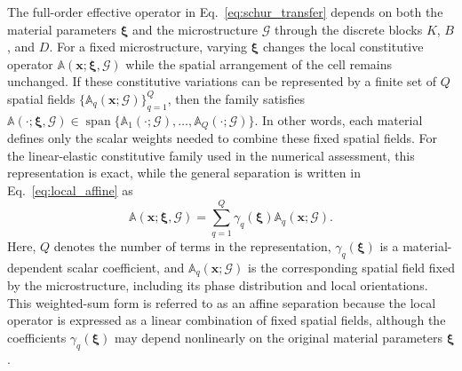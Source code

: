\documentclass[pdflatex,sn-basic,Numbered]{sn-jnl}
\newcommand{\G}{\mathcal{G}}
\begin{document}
The full-order effective operator in Eq.~\eqref{eq:schur_transfer} depends on
both the material parameters \(\boldsymbol\xi\) and the microstructure \(\G\)
through the discrete blocks \(K\), \(B\), and \(D\). For a fixed
microstructure, varying \(\boldsymbol\xi\) changes the local constitutive
operator \(\mathbb A(\boldsymbol x;\boldsymbol\xi,\G)\) while the spatial
arrangement of the cell remains unchanged. If these constitutive variations
can be represented by a finite set of \(Q\) spatial fields
\(\{\mathbb A_q(\boldsymbol x;\G)\}_{q=1}^{Q}\), then the family satisfies
\(\mathbb A(\cdot;\boldsymbol\xi,\G)\in
\operatorname{span}\{\mathbb A_1(\cdot;\G),\ldots,
\mathbb A_Q(\cdot;\G)\}\). In other words, each material defines only the
scalar weights needed to combine these fixed spatial fields. For the
linear-elastic constitutive family used in the numerical assessment, this
representation is exact, while the general separation is written in
Eq.~\eqref{eq:local_affine} as
\begin{equation}
\label{eq:local_affine}
\mathbb A(\boldsymbol x;\boldsymbol\xi,\G)
=
\sum_{q=1}^{Q}
\gamma_q(\boldsymbol\xi)
\mathbb A_q(\boldsymbol x;\G).
\end{equation}
Here, \(Q\) denotes the number of terms in the representation,
\(\gamma_q(\boldsymbol\xi)\) is a material-dependent scalar coefficient, and
\(\mathbb A_q(\boldsymbol x;\G)\) is the corresponding spatial field fixed by
the microstructure, including its phase distribution and local orientations.
This weighted-sum form is referred to as an affine separation because the
local operator is expressed as a linear combination of fixed spatial fields,
although the coefficients \(\gamma_q(\boldsymbol\xi)\) may depend
nonlinearly on the original material parameters \(\boldsymbol\xi\).
\end{document}
